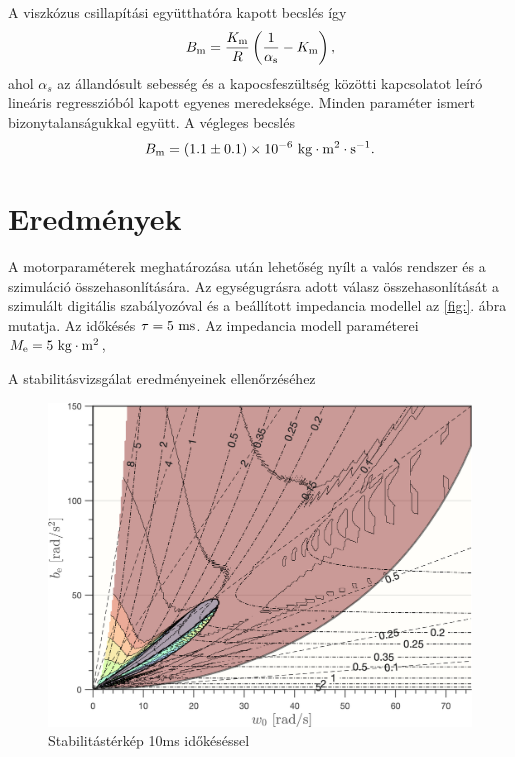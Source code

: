 A viszkózus csillapítási együtthatóra kapott becslés így
\begin{equation}
    B_{\mathrm{m}} = \frac{K_{\mathrm{m}}}{R}\left(\frac{1}{\alpha_{\mathrm{s}}} - K_{\mathrm{m}}\right),
\end{equation}
ahol \(\alpha_s\) az állandósult sebesség és a kapocsfeszültség közötti kapcsolatot 
leíró lineáris regresszióból kapott egyenes meredeksége. Minden paraméter ismert bizonytalanságukkal 
együtt. A végleges becslés
\begin{equation}
    B_{\mathrm{m}} = (1.1 \pm 0.1)\times 10^{-6}~\mathrm{kg\cdot m^2\cdot s^{-1}}.
\end{equation}

\section{Eredmények}
A motorparaméterek meghatározása után lehetőség nyílt a valós rendszer és a szimuláció összehasonlítására.
Az egységugrásra adott válasz összehasonlítását a szimulált digitális szabályozóval és a beállított impedancia modellel 
az \ref{fig:}. ábra mutatja. Az időkésés \(\tau = 5~\mathrm{ms}\). Az impedancia modell paraméterei 
\(M_{\mathrm{e}} = 5~\mathrm{kg \cdot m^2}\), 

A stabilitásvizsgálat eredményeinek ellenőrzéséhez 

\begin{figure}[H]
    \begin{center}
    \includegraphics[width=\textwidth]{images/stab_map_001.png}
    \caption{Stabilitástérkép 10ms időkéséssel}\label{fig:stab_map_001}
    \end{center}
\end{figure}

